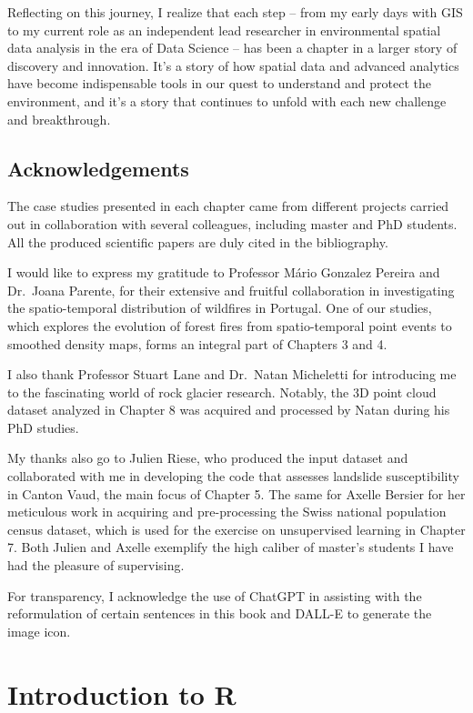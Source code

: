 \documentclass[
]{article}
\begin{document}
Reflecting on this journey, I realize that each step -- from my early days with GIS to my current role as an independent lead researcher in environmental spatial data analysis in the era of Data Science -- has been a chapter in a larger story of discovery and innovation.
It's a story of how spatial data and advanced analytics have become indispensable tools in our quest to understand and protect the environment, and it's a story that continues to unfold with each new challenge and breakthrough.

\subsection*{Acknowledgements}\label{acknowledgements}

The case studies presented in each chapter came from different projects carried out in collaboration with several colleagues, including master and PhD students.
All the produced scientific papers are duly cited in the bibliography.

I would like to express my gratitude to Professor Mário Gonzalez Pereira and Dr.~Joana Parente, for their extensive and fruitful collaboration in investigating the spatio-temporal distribution of wildfires in Portugal.
One of our studies, which explores the evolution of forest fires from spatio-temporal point events to smoothed density maps, forms an integral part of Chapters 3 and 4.

I also thank Professor Stuart Lane and Dr.~Natan Micheletti for introducing me to the fascinating world of rock glacier research.
Notably, the 3D point cloud dataset analyzed in Chapter 8 was acquired and processed by Natan during his PhD studies.

My thanks also go to Julien Riese, who produced the input dataset and collaborated with me in developing the code that assesses landslide susceptibility in Canton Vaud, the main focus of Chapter 5.
The same for Axelle Bersier for her meticulous work in acquiring and pre-processing the Swiss national population census dataset, which is used for the exercise on unsupervised learning in Chapter 7.
Both Julien and Axelle exemplify the high caliber of master's students I have had the pleasure of supervising.

For transparency, I acknowledge the use of ChatGPT in assisting with the reformulation of certain sentences in this book and DALL-E to generate the image icon.

\section{Introduction to R}\label{intro}
\end{document}

